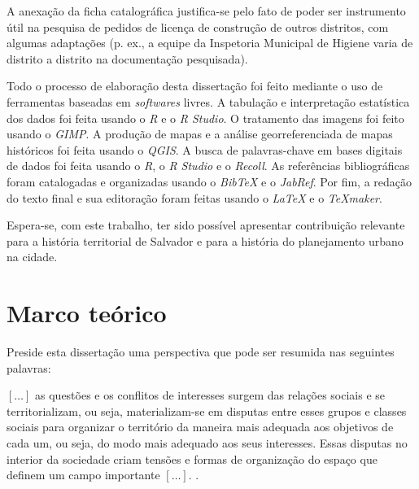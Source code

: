 A anexação da ficha catalográfica justifica-se pelo fato de poder ser instrumento útil na pesquisa de pedidos de licença de construção de outros distritos, com algumas adaptações (p. ex., a equipe da Inspetoria Municipal de Higiene varia de distrito a distrito na documentação pesquisada).

Todo o processo de elaboração desta dissertação foi feito mediante o uso de ferramentas baseadas em \textit{softwares} livres. A tabulação e interpretação estatística dos dados foi feita usando o \textit{R} e o \textit{R Studio}. O tratamento das imagens foi feito usando o \textit{GIMP}. A produção de mapas e a análise georreferenciada de mapas históricos foi feita usando o \textit{QGIS}. A busca de palavras-chave em bases digitais de dados foi feita usando o \textit{R}, o \textit{R Studio} e o \textit{Recoll}. As referências bibliográficas foram catalogadas e organizadas usando o \textit{BibTeX} e o \textit{JabRef}. Por fim, a redação do texto final e sua editoração foram feitas usando o \textit{LaTeX} e o \textit{TeXmaker}. 

Espera-se, com este trabalho, ter sido possível apresentar contribuição relevante para a história territorial de Salvador e para a história do planejamento urbano na cidade.

\section[Marco teórico]{Marco teórico}\label{sec:marcteor}

Preside esta dissertação uma perspectiva que pode ser resumida nas seguintes palavras:

\begin{citacao}
\([\dots]\) as questões e os conflitos de interesses surgem das relações sociais e se territorializam, ou seja, materializam-se em disputas entre esses grupos e classes sociais para organizar o território da maneira mais adequada aos objetivos de cada um, ou seja, do modo mais adequado aos seus interesses. Essas disputas no interior da sociedade criam tensões e formas de organização do espaço que definem um campo importante \([\dots]\). \cite[p.~41]{CASTRO2005}.
\end{citacao}

